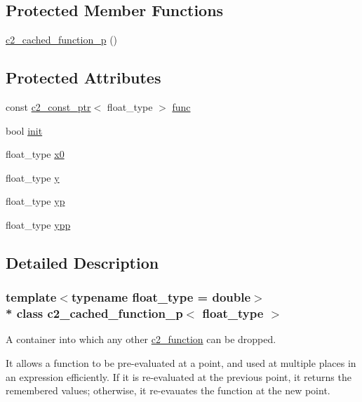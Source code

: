 \subsection*{Protected Member Functions}
\begin{DoxyCompactItemize}
\item 
\hyperlink{classc2__cached__function__p_a0ab20552983f693a3a6eb1603858f21d}{c2\+\_\+cached\+\_\+function\+\_\+p} ()
\end{DoxyCompactItemize}
\subsection*{Protected Attributes}
\begin{DoxyCompactItemize}
\item 
const \hyperlink{classc2__const__ptr}{c2\+\_\+const\+\_\+ptr}$<$ float\+\_\+type $>$ \hyperlink{classc2__cached__function__p_a3918bce2ff2768a71256c5ef9346416e}{func}
\item 
bool \hyperlink{classc2__cached__function__p_a67f6484e64960b65ae0f7127d72707ff}{init}
\item 
float\+\_\+type \hyperlink{classc2__cached__function__p_a0dac26fccad111242068e3b43e387483}{x0}
\item 
float\+\_\+type \hyperlink{classc2__cached__function__p_a0104e340e54e7e0b7da2ac4ed5fce2a8}{y}
\item 
float\+\_\+type \hyperlink{classc2__cached__function__p_a5e6fa7f5df36abad202ae18c94555cf9}{yp}
\item 
float\+\_\+type \hyperlink{classc2__cached__function__p_aa4c8bb8e2184ba1560aa3c63cb73095a}{ypp}
\end{DoxyCompactItemize}


\subsection{Detailed Description}
\subsubsection*{template$<$typename float\+\_\+type = double$>$\\*
class c2\+\_\+cached\+\_\+function\+\_\+p$<$ float\+\_\+type $>$}

A container into which any other \hyperlink{classc2__function}{c2\+\_\+function} can be dropped.

It allows a function to be pre-\/evaluated at a point, and used at multiple places in an expression efficiently. If it is re-\/evaluated at the previous point, it returns the remembered values; otherwise, it re-\/evauates the function at the new point. 

